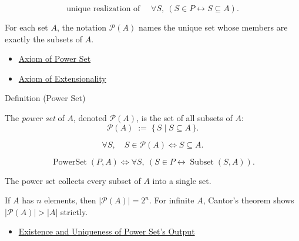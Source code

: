 \begin{remark*}
\[
  \text{unique realization of }\quad
  \forall S,\ (S\in P\leftrightarrow S\subseteq A).
\]
\end{remark*}

\begin{remark*}[Interpretation]
For each set \(A\), the notation \(\mathcal P(A)\) names the unique set whose
members are exactly the subsets of \(A\).
\end{remark*}

\begin{dependencies}
\begin{itemize}
  \item \hyperref[ax:power-set]{Axiom of Power Set}
  \item \hyperref[ax:extensionality]{Axiom of Extensionality}
\end{itemize}
\end{dependencies}

\begin{definitionbox}{Definition (Power Set)}
\begin{definition}\label{def:power-set}
The \emph{power set} of $A$, denoted $\mathcal{P}(A)$, is the set of all
subsets of $A$:
\[
\mathcal{P}(A) \;:=\; \{\, S \mid S \subseteq A \,\}.
\]
\end{definition}
\end{definitionbox}

\begin{remark*}
\[
  \forall S,\quad S\in\mathcal{P}(A)\iff S\subseteq A.
\]
\end{remark*}

\begin{remark*}
\[
  \operatorname{PowerSet}(P,A)
  \iff
  \forall S,\ (S\in P\leftrightarrow \operatorname{Subset}(S,A)).
\]
\end{remark*}

\begin{remark*}[Interpretation]
The power set collects every subset of $A$ into a single set.
\end{remark*}

\begin{remark*}[Exposition]
If $A$ has $n$ elements, then $|\mathcal{P}(A)| = 2^n$. For infinite $A$,
Cantor's theorem shows $|\mathcal{P}(A)| > |A|$ strictly.
\end{remark*}

\begin{dependencies}
\begin{itemize}
  \item \hyperref[thm:power-set-output-exists-unique]{Existence and Uniqueness of Power Set's Output}
\end{itemize}
\end{dependencies}


